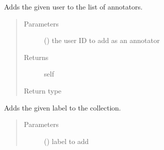\documentclass[letterpaper,10pt,english]{sphinxmanual}
\begin{document}
\begin{fulllineitems}
\begin{fulllineitems}
\label{\detokenize{autoapi/pine/client/index:pine.client.CollectionBuilder.annotator}}
\sphinxAtStartPar
Adds the given user to the list of annotators.
\begin{quote}\begin{description}
\item[{Parameters}] \leavevmode
\sphinxAtStartPar
{} () \textendash{} the user ID to add as an annotator

\item[{Returns}] \leavevmode
\sphinxAtStartPar
self

\item[{Return type}] \leavevmode
\sphinxAtStartPar
{\hyperref[\detokenize{autoapi/pine/client/models/index:pine.client.models.CollectionBuilder}]{}}

\end{description}\end{quote}

\end{fulllineitems}


\begin{fulllineitems}
\label{\detokenize{autoapi/pine/client/index:pine.client.CollectionBuilder.label}}
\sphinxAtStartPar
Adds the given label to the collection.
\begin{quote}\begin{description}
\item[{Parameters}] \leavevmode
\sphinxAtStartPar
{} () \textendash{} label to add


\end{description}
\end{quote}
\end{fulllineitems}
\end{fulllineitems}
\end{document}
